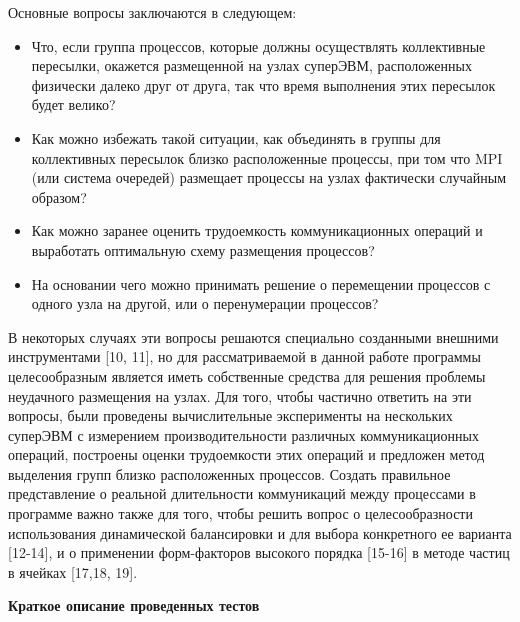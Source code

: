         Основные вопросы заключаются в следующем:
        \begin{itemize} 
        \item Что, если группа процессов, которые должны осуществлять коллективные пересылки, окажется размещенной на узлах суперЭВМ, расположенных физически далеко друг от друга, так что время выполнения этих пересылок будет велико?
        \item Как можно избежать такой ситуации, как объединять в группы для коллективных пересылок близко расположенные процессы, при том что MPI (или система очередей) размещает процессы на узлах фактически случайным образом? 
        \item Как можно заранее оценить трудоемкость коммуникационных операций и выработать оптимальную схему размещения процессов? 
        \item На основании чего можно принимать решение о перемещении процессов с одного узла на другой, или о перенумерации процессов?
        \end{itemize} 
        В некоторых случаях эти вопросы решаются специально созданными внешними инструментами [10, 11], но для рассматриваемой в данной работе программы целесообразным является иметь собственные средства для решения проблемы неудачного размещения на узлах.
        Для того, чтобы частично ответить на эти вопросы, были проведены вычислительные эксперименты на нескольких суперЭВМ с измерением производительности различных коммуникационных операций, построены оценки трудоемкости этих операций и предложен метод выделения групп близко расположенных процессов. Создать правильное представление о реальной длительности коммуникаций между процессами в программе важно также для того, чтобы решить вопрос о целесообразности использования динамической балансировки и для выбора конкретного ее варианта [12-14], и о применении форм-факторов высокого порядка [15-16] в методе частиц в ячейках [17,18, 19]. 
        
        \textbf{Краткое описание проведенных тестов}
        
